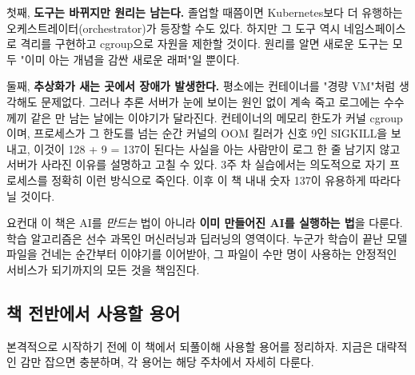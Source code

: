 첫째, \textbf{도구는 바뀌지만 원리는 남는다.} 졸업할 때쯤이면 Kubernetes보다 더 유행하는 오케스트레이터(orchestrator)가 등장할 수도 있다. 하지만 그 도구 역시 네임스페이스로 격리를 구현하고 cgroup으로 자원을 제한할 것이다. 원리를 알면 새로운 도구는 모두 "이미 아는 개념을 감싼 새로운 래퍼"일 뿐이다.

둘째, \textbf{추상화가 새는 곳에서 장애가 발생한다.} 평소에는 컨테이너를 "경량 VM"처럼 생각해도 문제없다. 그러나 추론 서버가 눈에 보이는 원인 없이 계속 죽고 로그에는 수수께끼 같은 만 남는 날에는 이야기가 달라진다. 컨테이너의 메모리 한도가 커널 cgroup이며, 프로세스가 그 한도를 넘는 순간 커널의 OOM 킬러가 신호 9인 SIGKILL을 보내고, 이것이 128 + 9 = 137이 된다는 사실을 아는 사람만이 로그 한 줄 남기지 않고 서버가 사라진 이유를 설명하고 고칠 수 있다. 3주 차 실습에서는 의도적으로 자기 프로세스를 정확히 이런 방식으로 죽인다. 이후 이 책 내내 숫자 137이 유용하게 따라다닐 것이다.

요컨대 이 책은 AI를 \textit{만드는} 법이 아니라 \textbf{이미 만들어진 AI를 실행하는 법}을 다룬다. 학습 알고리즘은 선수 과목인 머신러닝과 딥러닝의 영역이다. 누군가 학습이 끝난 모델 파일을 건네는 순간부터 이야기를 이어받아, 그 파일이 수만 명이 사용하는 안정적인 서비스가 되기까지의 모든 것을 책임진다.

\subsection*{책 전반에서 사용할 용어}

본격적으로 시작하기 전에 이 책에서 되풀이해 사용할 용어를 정리하자. 지금은 대략적인 감만 잡으면 충분하며, 각 용어는 해당 주차에서 자세히 다룬다.

